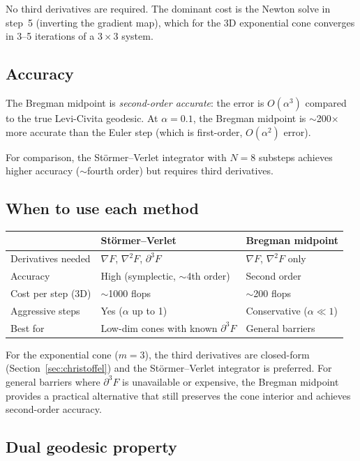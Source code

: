 \documentclass[11pt]{article}
\begin{document}
No third derivatives are required.  The dominant cost is the Newton solve
in step~5 (inverting the gradient map), which for the 3D exponential cone
converges in 3--5 iterations of a $3 \times 3$ system.

\subsection{Accuracy}

The Bregman midpoint is \emph{second-order accurate}: the error is $O(\alpha^3)$
compared to the true Levi-Civita geodesic.  At $\alpha = 0.1$, the Bregman
midpoint is $\sim$200$\times$ more accurate than the Euler step (which is
first-order, $O(\alpha^2)$ error).

For comparison, the St\"ormer--Verlet integrator with $N = 8$ substeps achieves
higher accuracy ($\sim$fourth order) but requires third derivatives.

\subsection{When to use each method}

\begin{center}
\begin{tabular}{@{}lll@{}}
\toprule
& \textbf{St\"ormer--Verlet} & \textbf{Bregman midpoint} \\
\midrule
Derivatives needed & $\nabla F$, $\nabla^2 F$, $\partial^3 F$ & $\nabla F$, $\nabla^2 F$ only \\
Accuracy & High (symplectic, $\sim$4th order) & Second order \\
Cost per step (3D) & $\sim$1000 flops & $\sim$200 flops \\
Aggressive steps & Yes ($\alpha$ up to 1) & Conservative ($\alpha \ll 1$) \\
Best for & Low-dim cones with known $\partial^3 F$ & General barriers \\
\bottomrule
\end{tabular}
\end{center}

For the exponential cone ($m = 3$), the third derivatives are closed-form
(Section~\ref{sec:christoffel}) and the St\"ormer--Verlet integrator is preferred.
For general barriers where $\partial^3 F$ is unavailable or expensive, the Bregman
midpoint provides a practical alternative that still preserves the cone interior
and achieves second-order accuracy.

\subsection{Dual geodesic property}
\end{document}
